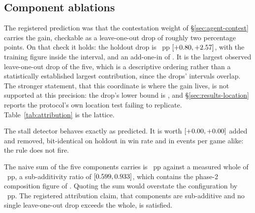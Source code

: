 \subsection{Component ablations}
\label{sec:results-attribution}

The registered prediction was that the contestation weight of \S\ref{sec:agent-contest} carries the
gain, checkable as a leave-one-out drop of roughly two percentage points. On that check it holds:
the holdout drop is \vsevenLooRtwelve{}~pp $[+0.80, +2.57]$, with the
training figure \vsevenTrainRtwelveLoo{} inside the interval, and an add-one-in of
\vsevenAddInRtwelve{}. It is the largest observed leave-one-out drop of the five, which is a
descriptive ordering rather than a statistically established largest contribution, since the
drops' intervals overlap. The stronger statement, that this coordinate is where the gain lives, is
not supported at this precision: the drop's lower bound is \vsevenLooRtwelveLo{}, and
\S\ref{sec:results-location} reports the protocol's own location test failing to replicate.
Table~\ref{tab:attribution} is the lattice.

\begin{table}[!ht]\centering
\caption{The attribution lattice, in percentage points of win-rate edge against the deployed
\vsix{} policy on the two lattice banks. Add-one-in is the edge of the deployed policy plus the
named component; leave-one-out is the drop from \sestina{}'s edge when the component is removed, a
between-cell contrast whose interval is propagated as in \S\ref{sec:evaluation-intervals}.
Reference cell \sestina{} against the deployed policy on the lattice banks: \vsevenBfiveWhole{}
$[\vsevenBfiveWholeLo, \vsevenBfiveWholeHi]$. Harness identifiers are given in parentheses.}
\label{tab:attribution}
{\tabfont}
\end{table}

The stall detector behaves exactly as predicted. It is worth \vsevenAddInStall{}
$[+0.00, +0.00]$ added and \vsevenLooStall{} removed, bit-identical on
holdout in win rate and in events per game alike: the rule does not fire.

The naive sum of the five components \sestina{} carries is \vsevenBfiveSum{}~pp against a measured
whole of \vsevenBfiveWhole{}~pp, a sub-additivity ratio of \vsevenSubAdditivity{}
$[0.599, 0.933]$, which contains the phase-2 composition figure of
\vsevenSubAddPhaseTwo{}. Quoting the sum would overstate the configuration by
\vsevenSubAdditivityOverstate{}~pp. The registered attribution claim, that components are
sub-additive and no single leave-one-out drop exceeds the whole, is satisfied.

